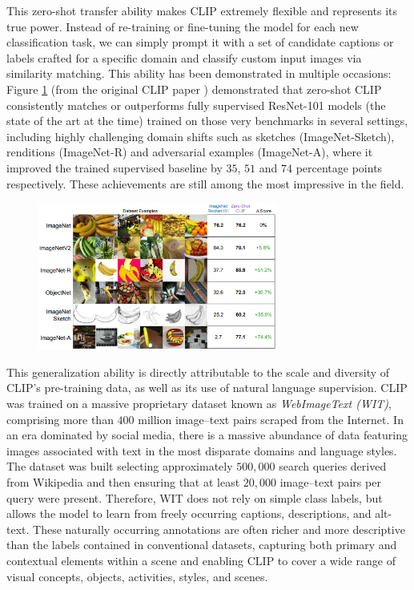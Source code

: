 \documentclass[a4paper, oneside, english]{sapthesis} %
\begin{document}
This zero-shot transfer ability makes CLIP extremely flexible and represents its true power. Instead of re-training or fine-tuning the model for each new classification task, we can simply prompt it with a set of candidate captions or labels crafted for a specific domain and classify custom input images via similarity matching. This ability has been demonstrated in multiple occasions: Figure \ref{fig:clipzs2} (from the original CLIP paper \cite{radford2021learning}) demonstrated that zero-shot CLIP consistently matches or outperforms fully supervised ResNet-101 models (the state of the art at the time) trained on those very benchmarks in several settings, including highly challenging domain shifts such as sketches (ImageNet-Sketch), renditions (ImageNet-R) and adversarial examples (ImageNet-A), where it improved the trained supervised baseline by $35$, $51$ and $74$ percentage points respectively. These achievements are still among the most impressive in the field.

\begin{figure}[h]
    \centering
    \includegraphics[width=0.7\textwidth]{img/CLIP_zero_shot.png}
    \caption{}
    \label{fig:clipzs2}
\end{figure}

This generalization ability is directly attributable to the scale and diversity of CLIP's pre-training data, as well as its use of natural language supervision. CLIP was trained on a massive proprietary dataset known as \emph{WebImageText (WIT)}, comprising more than $400$ million image–text pairs scraped from the Internet. In an era dominated by social media, there is a massive abundance of data featuring images associated with text in the most disparate domains and language styles. The dataset was built selecting approximately $500,000$ search queries derived from Wikipedia and then ensuring that at least $20,000$ image–text pairs per query were present. Therefore, WIT does not rely on simple class labels, but allows the model to learn from freely occurring captions, descriptions, and alt-text. These naturally occurring annotations are often richer and more descriptive than the labels contained in conventional datasets, capturing both primary and contextual elements within a scene and enabling CLIP to cover a wide range of visual concepts, objects, activities, styles, and scenes.
\end{document}
